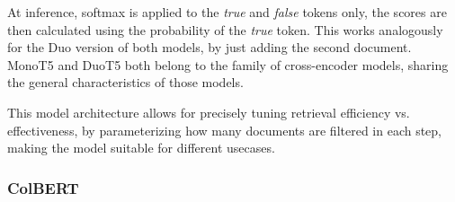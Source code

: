 At inference, softmax is applied to the \emph{true} and \emph{false} tokens only, the scores are then calculated using the probability of the \emph{true} token.
This works analogously for the Duo version of both models, by just adding the second document.
MonoT5 and DuoT5 both belong to the family of cross-encoder models, sharing the general characteristics of those models.

This model architecture allows for precisely tuning retrieval efficiency vs. effectiveness, by parameterizing how many documents are filtered in each step, making the model suitable for different usecases.


\subsubsection{ColBERT}\label{sec:colbert}
